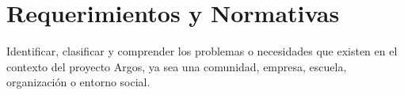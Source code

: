 \chapter{Requerimientos y Normativas}

Identificar, clasificar y comprender los problemas o necesidades que existen en el contexto del proyecto Argos, ya sea una comunidad, empresa, escuela, organización o entorno social.
